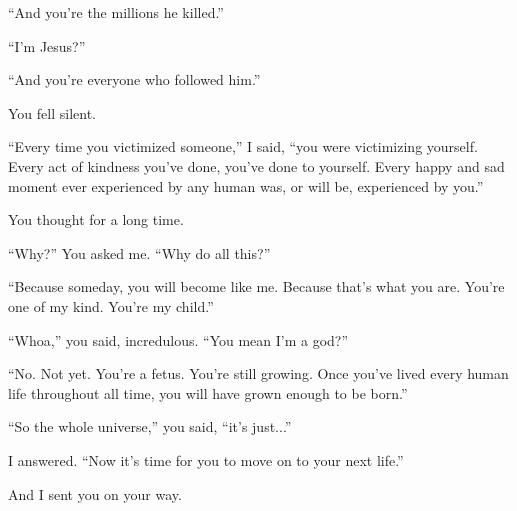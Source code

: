 “And you're the millions he killed.”


“I'm Jesus?”

“And you're everyone who followed him.”

You fell silent.

“Every time you victimized someone,” I said, “you were victimizing yourself. Every act of kindness you've done, you've done to yourself. Every happy and sad moment ever experienced by any human was, or will be, experienced by you.”

You thought for a long time.

“Why?” You asked me. “Why do all this?”

“Because someday, you will become like me. Because that's what you are. You're one of my kind. You're my child.”

“Whoa,” you said, incredulous. “You mean I'm a god?”

“No. Not yet. You're a fetus. You're still growing. Once you've lived every human life throughout all time, you will have grown enough to be born.”

“So the whole universe,” you said, “it's just...”

\vspace{5mm}{ \Huge “An egg.” } I answered. “Now it's time for you to move on to your next life.”

And I sent you on your way.


